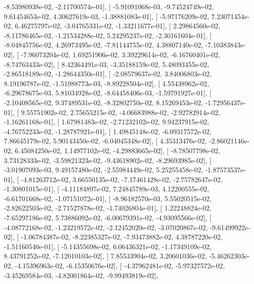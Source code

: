 \documentclass{article}
\begin{document}
         -8.53980938e-02,  -2.11700574e-01],
       [ -5.91091068e-03,  -9.74524749e-02,   9.61454653e-02,
          4.30627619e-03,  -1.38881083e-01],
       [ -5.97176209e-02,   7.23071454e-02,   6.46275797e-02,
         -3.04765331e-02,  -1.33211677e-01],
       [  2.29864560e-02,  -8.11786465e-02,  -1.21534288e-02,
          5.24295237e-02,  -2.30161604e-01],
       [ -8.04845756e-02,   4.26973495e-02,  -7.81144755e-02,
          4.38807140e-02,  -7.10383843e-02],
       [ -7.96073204e-02,   1.69251906e-02,   3.39229614e-02,
         -6.16760401e-02,  -8.74763433e-02],
       [  8.42364491e-03,  -3.35188159e-02,   5.48093455e-02,
         -2.86518189e-02,  -1.28644350e-01],
       [ -2.08579637e-02,   3.84006803e-02,   8.19196787e-02,
         -1.51988773e-03,  -8.89228504e-02],
       [  4.55438962e-02,  -6.29678675e-03,   5.81034928e-02,
         -8.64458406e-03,  -1.59791927e-01],
       [ -2.10408565e-02,   9.37489531e-02,  -8.32802750e-02,
          8.15269453e-02,  -1.72956437e-01],
       [  9.55751902e-02,   2.75655215e-02,  -4.06683988e-02,
         -2.92782914e-02,  -1.16261168e-01],
       [  1.67981483e-02,  -2.71232102e-02,   9.94237915e-02,
         -4.76752233e-02,  -1.28787921e-01],
       [  1.49845148e-02,  -6.09317572e-02,   7.86645179e-02,
          5.90143450e-02,  -6.04045348e-02],
       [  4.35313476e-02,  -2.86021146e-02,   6.45084250e-02,
          1.14977102e-02,  -4.29883665e-02],
       [ -8.78507798e-02,   3.73128333e-02,  -3.59821323e-02,
         -9.43618902e-02,  -8.29693985e-02],
       [ -3.01907093e-03,   9.49157480e-02,  -2.55984449e-02,
          5.25255458e-02,  -1.87573537e-01],
       [ -4.81263712e-02,   3.66550135e-02,  -7.17461428e-02,
         -2.75782647e-02,  -1.30801015e-01],
       [ -4.11184897e-02,   7.24845789e-03,   4.12200555e-02,
         -6.61701668e-02,  -1.07151072e-01],
       [ -8.96182570e-03,   5.55020515e-02,  -2.82622503e-02,
         -2.71527878e-02,  -1.74026804e-01],
       [  1.22248824e-02,  -7.65297186e-02,   5.73886092e-02,
         -6.00679391e-02,  -4.93095566e-02],
       [ -4.08772168e-02,  -1.23219572e-02,  -2.12452020e-02,
         -3.07020867e-02,  -9.61499922e-02],
       [ -1.06784387e-02,  -8.22385327e-02,  -7.93473882e-02,
          4.38787220e-02,  -1.51160540e-01],
       [ -5.14355698e-02,   6.06436321e-02,  -1.17349109e-02,
          8.43791252e-02,  -7.12010103e-02],
       [  7.85533904e-02,   3.20601036e-02,  -5.46262303e-02,
         -4.15396963e-02,  -6.15350676e-02],
       [ -4.37962481e-02,  -5.97327572e-02,  -3.45269584e-03,
         -4.82001864e-02,  -9.99493819e-02],
\end{document}

